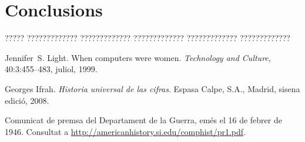 \documentclass[11pt,english,listoffigures,listoftables]{tfgetsinf}
\begin{document}
\chapter{Conclusions}

????? ????????????? ????????????? ????????????? ????????????? ????????????? 


\begin{thebibliography}{10}

   Jennifer~S. Light.
   \newblock When computers were women.
   \newblock \textit{Technology and Culture}, 40:3:455--483, juliol, 1999.

   Georges Ifrah.
   \newblock \textit{Historia universal de las cifras}.
   \newblock Espasa Calpe, S.A., Madrid, sisena edició, 2008.

   Comunicat de premsa del Departament de la Guerra, 
   emés el 16 de febrer de 1946. 
   \newblock Consultat a 
   \url{http://americanhistory.si.edu/comphist/pr1.pdf}.

\end{thebibliography}
\cleardoublepage


\APPENDIX

\end{document}
